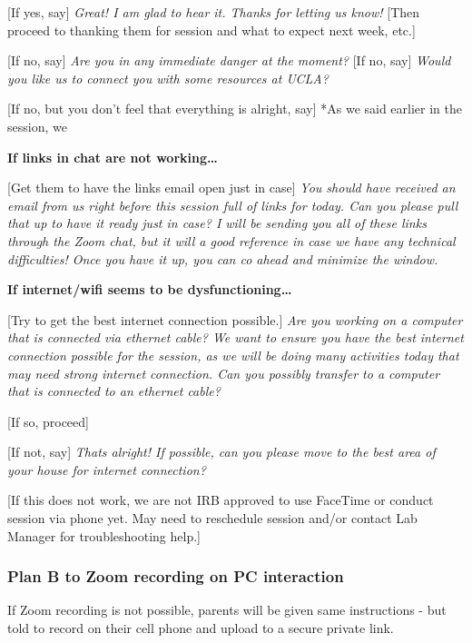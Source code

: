 \documentclass[]{book}
\begin{document}
{[}If yes, say{]} \emph{Great! I am glad to hear it. Thanks for letting us know!} {[}Then proceed to thanking them for session and what to expect next week, etc.{]}

{[}If no, say{]} \emph{Are you in any immediate danger at the moment?} {[}If no, say{]} \emph{Would you like us to connect you with some resources at UCLA?}

{[}If no, but you don't feel that everything is alright, say{]} *As we said earlier in the session, we

\textbf{If links in chat are not working\ldots{}}

{[}Get them to have the links email open just in case{]}
\emph{You should have received an email from us right before this session full of links for today. Can you please pull that up to have it ready just in case? I will be sending you all of these links through the Zoom chat, but it will a good reference in case we have any technical difficulties! Once you have it up, you can co ahead and minimize the window.}

\textbf{If internet/wifi seems to be dysfunctioning\ldots{}}

{[}Try to get the best internet connection possible.{]}
\emph{Are you working on a computer that is connected via ethernet cable? We want to ensure you have the best internet connection possible for the session, as we will be doing many activities today that may need strong internet connection. Can you possibly transfer to a computer that is connected to an ethernet cable?}

{[}If so, proceed{]}

{[}If not, say{]} \emph{Thats alright! If possible, can you please move to the best area of your house for internet connection?}

{[}If this does not work, we are not IRB approved to use FaceTime or conduct session via phone yet. May need to reschedule session and/or contact Lab Manager for troubleshooting help.{]}

\hypertarget{plan-b-to-zoom-recording-on-pc-interaction}{%
\subsubsection{Plan B to Zoom recording on PC interaction}\label{plan-b-to-zoom-recording-on-pc-interaction}}

If Zoom recording is not possible, parents will be given same instructions - but told to record on their cell phone and upload to a secure private link.
\end{document}
